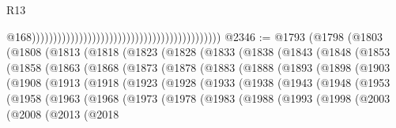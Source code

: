 \begin{lexlean}{R13}
\begin{coremodule}
{{{{{{{{{{{{{{{{{{{{{{{{{{{{{{{{{{{{{{{{{{{{{{{{{{{{{{{{{{{{{{{{{{{{{{{{{{{{{{{{{{{{{{{{{{{{{{{{{{{{{{{{{{                                                                                            @168))))))))))))))))))))))))))))))))))))))))))))
@2346 := @1793
    (@1798
      (@1803
        (@1808
          (@1813
            (@1818
              (@1823
                (@1828
                  (@1833
                    (@1838
                      (@1843
                        (@1848
                          (@1853
                            (@1858
                              (@1863
                                (@1868
                                  (@1873
                                    (@1878
                                      (@1883
                                        (@1888
                                          (@1893
                                            (@1898
                                              (@1903
                                                (@1908
                                                  (@1913
                                                    (@1918
                                                      (@1923
                                                        (@1928
                                                          (@1933
                                                            (@1938
                                                              (@1943
                                                                (@1948
                                                                  (@1953
                                                                    (@1958
                                                                      (@1963
                                                                        (@1968
                                                                          (@1973
                                                                            (@1978
                                                                              (@1983
                                                                                (@1988
                                                                                  (@1993
                                                                                    (@1998
                                                                                      (@2003
                                                                                        (@2008
                                                                                          (@2013
                                                                                            (@2018
}}}}}}}}}}}}}}}}}}}}}}}}}}}}}}}}}}}}}}}}}}}}}}}}}}}}}}}}}}}}}}}}}}}}}}}}}}}}}}}}}}}}}}}}}}}}}}}}}}}}}}}}}}
\end{coremodule}
\end{lexlean}
